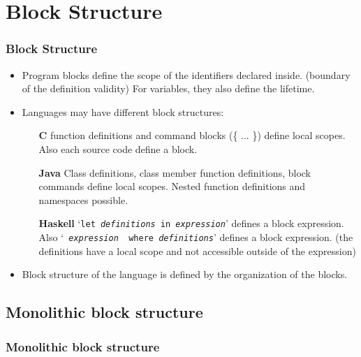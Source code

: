\section{Block Structure}
\begin{frame}
 \frametitle{Block Structure}
\begin{itemize}[<+->]
 \item  Program blocks define the scope of the identifiers declared inside. (boundary of the
 definition validity) For variables, they also define the lifetime. 
 \item Languages may have different block structures:
\begin{itemize}
\item[\bf C] function definitions and command blocks (\{ ... \}) define local scopes. Also each
source code define a block.
\item[\bf Java] Class definitions, class member function definitions, block commands define
local scopes. Nested function definitions and namespaces possible.
\item[\bf Haskell] `\texttt{let {\em definitions\/} in {\em expression\/}}' defines a block
expression. Also `\texttt{ {\em expression \/} where {\em definitions\/}}' defines a block
expression. (the definitions have a local scope and not accessible outside of the expression)
\end{itemize}
\item Block structure of the language is defined by the organization of the blocks.
\end{itemize}
\end{frame}

\subsection{Monolithic block structure}
\begin{frame}
 \frametitle{Monolithic block structure}

\end{frame}

